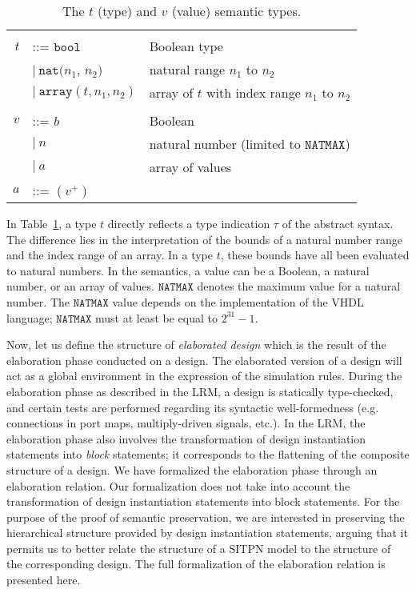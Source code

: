 \begin{table}[!htbp]
  \caption{The $t$ (type) and $v$ (value) semantic types.}
  \label{tab:type-value}

  \begin{tabular}{|rll|}
    \hline
    && \\
    $t$ & ::= $\mathtt{bool}$ & Boolean type \\
    & \quad $\vert~\mathtt{nat}(n_1$, $n_2)$ & natural range $n_1$ to $n_2$ \\
    & \quad $\vert~\mathtt{array}(t, n_1, n_2)$ & array of $t$ with index range $n_1$ to $n_2$ \\
    & & \\
    $v$ & ::= $b$ & Boolean \\
    & \quad $\vert~{}n$ & natural number (limited to $\mathtt{NATMAX}$) \\
    & \quad $\vert~a$ & array of values \\
    $a$ & ::= $(v^{+})$ & \\
    \hline
  \end{tabular}    
\end{table}

In Table~\ref{tab:type-value}, a type $t$ directly reflects a type
indication $\tau$ of the abstract syntax. The difference lies in the
interpretation of the bounds of a natural number range and the index
range of an array. In a type $t$, these bounds have all been evaluated
to natural numbers. In the \hvhdl{} semantics, a value can be a
Boolean, a natural number, or an array of values. $\mathtt{NATMAX}$
denotes the maximum value for a natural number.  The $\mathtt{NATMAX}$
value depends on the implementation of the \textsf{VHDL} language;
$\mathtt{NATMAX}$ must at least be equal to $2^{31}-1$.

Now, let us define the structure of \textit{elaborated design} which
is the result of the elaboration phase conducted on a \hvhdl{}
design. The elaborated version of a design will act as a global
environment in the expression of the simulation rules. During the
elaboration phase as described in the LRM, a design is statically
type-checked, and certain tests are performed regarding its syntactic
well-formedness (e.g. connections in port maps, multiply-driven
signals, etc.). In the LRM, the elaboration phase also involves the
transformation of design instantiation statements into \textit{block}
statements; it corresponds to the flattening of the composite
structure of a design.  We have formalized the elaboration phase
through an elaboration relation. Our formalization does not take into
account the transformation of design instantiation statements into
block statements. For the purpose of the proof of semantic
preservation, we are interested in preserving the hierarchical
structure provided by design instantiation statements, arguing that it
permits us to better relate the structure of a SITPN model to the
structure of the corresponding \hvhdl{} design. The full formalization
of the elaboration relation is presented
here\cite{Iampietro2021}.

